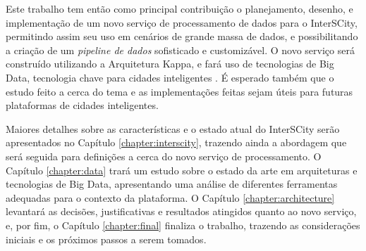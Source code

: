 Este trabalho tem então como principal contribuição o planejamento, desenho, e
implementação de um novo serviço de processamento de dados para o InterSCity,
permitindo assim seu uso em cenários de grande massa de dados, e possibilitando
a criação de um \textit{pipeline de dados} sofisticado e customizável. O novo
serviço será construído utilizando a Arquitetura Kappa, e fará uso de
tecnologias de Big Data, tecnologia chave para cidades inteligentes
\cite{batty2012smart}. É esperado também que o estudo feito a cerca do tema
e as implementações feitas sejam úteis para futuras plataformas de cidades
inteligentes.

Maiores detalhes sobre as características e o estado atual do InterSCity serão
apresentados no Capítulo \ref{chapter:interscity}, trazendo ainda a abordagem que será
seguida para definições a cerca do novo serviço de processamento. O Capítulo
\ref{chapter:data} trará um estudo sobre o estado da arte em arquiteturas e
tecnologias de Big Data, apresentando uma análise de diferentes ferramentas
adequadas para o contexto da plataforma. O Capítulo \ref{chapter:architecture}
levantará as decisões, justificativas e resultados atingidos quanto ao novo
serviço, e, por fim, o Capítulo \ref{chapter:final} finaliza o trabalho,
trazendo as considerações iniciais e os próximos passos a serem tomados.
